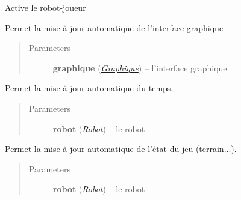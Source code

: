 \documentclass[letterpaper,10pt,english]{sphinxmanual}
\begin{document}

\begin{fulllineitems}
\label{index:graphique_lolipooo.play_pooo}
Active le robot-joueur

\end{fulllineitems}


\begin{fulllineitems}
\label{index:graphique_lolipooo.updateGraphique}
Permet la mise à jour automatique de l'interface graphique
\begin{quote}\begin{description}
\item[{Parameters}] \leavevmode
\textbf{graphique} ({\hyperref[index:module-Graphique]{\emph{Graphique}}}) -- l'interface graphique

\end{description}\end{quote}

\end{fulllineitems}


\begin{fulllineitems}
\label{index:graphique_lolipooo.updateTime}
Permet la mise à jour automatique du temps.
\begin{quote}\begin{description}
\item[{Parameters}] \leavevmode
\textbf{robot} ({\hyperref[index:module-Robot]{\emph{Robot}}}) -- le robot

\end{description}\end{quote}

\end{fulllineitems}


\begin{fulllineitems}
\label{index:graphique_lolipooo.updateGame}
Permet la mise à jour automatique de l'état du jeu (terrain...).
\begin{quote}\begin{description}
\item[{Parameters}] \leavevmode
\textbf{robot} ({\hyperref[index:module-Robot]{\emph{Robot}}}) -- le robot

\end{description}\end{quote}

\end{fulllineitems}
\end{document}
